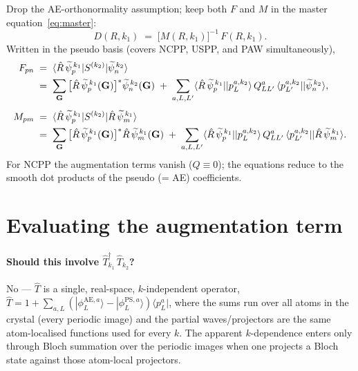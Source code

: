 \documentclass[11pt]{article}
\newcommand{\bra}[1]{\langle #1 |}
\newcommand{\ket}[1]{| #1 \rangle}
\newcommand{\matel}[3]{\langle #1 | #2 | #3 \rangle}
\newcommand{\AEt}{\mathrm{AE}}
\newcommand{\rotpsipt}[2]{\hat{R}\,\widetilde{\psi}_{#1}^{\,#2}}
\newcommand{\psipt}[2]{\widetilde{\psi}_{#1}^{\,#2}}
\begin{document}
Drop the AE-orthonormality assumption; keep both $F$ and $M$ in the
master equation~\eqref{eq:master}:
\begin{equation}
  \boxed{
  D(R, k_1) \;=\; \big[M(R, k_1)\big]^{-1}\,F(R, k_1).
  }
  \label{eq:D-nonorth}
\end{equation}
Written in the pseudo basis (covers NCPP, USPP, and PAW
simultaneously),
\begin{align}
  F_{pn} &\;=\;
        \matel{\rotpsipt{p}{k_1}}{S^{(k_2)}}{\psipt{n}{k_2}}
        \notag \\
        &\;=\;
        \sum_{\mathbf{G}} \big[\rotpsipt{p}{k_1}(\mathbf{G})\big]^{*}
                          \psipt{n}{k_2}(\mathbf{G})
        \;+\;
        \sum_{a, L, L'}
              \matel{\rotpsipt{p}{k_1}}{}{p_L^{a, k_2}}\,
              Q^a_{LL'}\,
              \matel{p_{L'}^{a, k_2}}{}{\psipt{n}{k_2}},
  \\[4pt]
  M_{pm} &\;=\;
        \matel{\rotpsipt{p}{k_1}}{S^{(k_2)}}{\rotpsipt{m}{k_1}}
        \notag \\
        &\;=\;
        \sum_{\mathbf{G}} \big[\rotpsipt{p}{k_1}(\mathbf{G})\big]^{*}
                          \rotpsipt{m}{k_1}(\mathbf{G})
        \;+\;
        \sum_{a, L, L'}
              \matel{\rotpsipt{p}{k_1}}{}{p_L^{a, k_2}}\,
              Q^a_{LL'}\,
              \matel{p_{L'}^{a, k_2}}{}{\rotpsipt{m}{k_1}}.
\end{align}
For NCPP the augmentation terms vanish ($Q \equiv 0$); the equations
reduce to the smooth dot products of the pseudo (= AE) coefficients.

\section*{Evaluating the augmentation term}

\paragraph{Should this involve $\widehat{T}_{k_1}^{\dagger}\,\widehat{T}_{k_2}$?}
No --- $\widehat{T}$ is a single, real-space, $k$-independent operator,
$\widehat{T} = 1 + \sum_{a,L}(\ket{\phi_L^{\AEt,a}} -
\ket{\phi_L^{\mathrm{PS},a}})\bra{p_L^{a}}$, where the sums run over
all atoms in the crystal (every periodic image) and the partial
waves/projectors are the same atom-localised functions used for every
$k$. The apparent $k$-dependence enters only through Bloch summation
over the periodic images when one projects a Bloch state against
those atom-local projectors.
\end{document}
